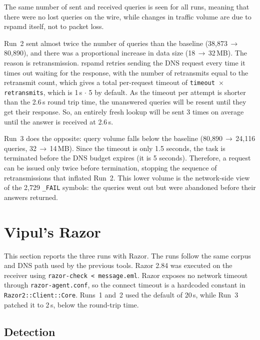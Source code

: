 The same number of sent and received queries is seen for all runs, meaning that there were no lost queries on the wire, while changes in traffic volume are due to rspamd itself, not to packet loss.

Run~2 sent almost twice the number of queries than the baseline (38{,}873\,$\to$\,80{,}890), and there was a proportional increase in data size (18\,$\to$\,32\,MB). The reason is retransmission. rspamd retries sending the DNS request every time it times out waiting for the response, with the number of retransmits equal to the retransmit count, which gives a total per-request timeout of \texttt{timeout\,$\times$\,retransmits}, which is 1\,s $\cdot$ 5 by default. As the timeout per attempt is shorter than the 2.6\,s round trip time, the unanswered queries will be resent until they get their response. So, an entirely fresh lookup will be sent 3 times on average until the answer is received at 2.6\,s.


Run~3 does the opposite: query volume falls below the baseline (80{,}890$\,\rightarrow$\,24{,}116 queries, 32$\,\rightarrow$\,14\,MB). Since the timeout is only 1.5 seconds, the task is terminated before the DNS budget expires (it is 5 seconds). Therefore, a request can be issued only twice before termination, stopping the sequence of retransmissions that inflated
Run~2. This lower volume is the network-side view of the 2{,}729 \texttt{\_FAIL} symbols: the queries went out but were abandoned before
their answers returned.


\section{Vipul's Razor}

This section reports the three runs with Razor. The runs follow the same corpus
and DNS path used by the previous tools. Razor 2.84 was executed on the receiver
using \texttt{razor-check < message.eml}. Razor exposes no network timeout through
\texttt{razor-agent.conf}, so the connect timeout is a hardcoded constant in
\texttt{Razor2::Client::Core}. Runs~1 and~2 used the default of 20\,s, while
Run~3 patched it to 2\,s, below the round-trip time.

\subsection{Detection}

